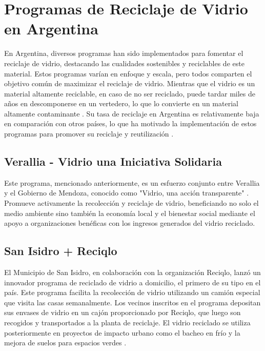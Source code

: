 \documentclass[main.tex]{subfiles}
\begin{document}
\section{Programas de Reciclaje de Vidrio en Argentina}

En Argentina, diversos programas han sido implementados para fomentar el reciclaje de vidrio, destacando las cualidades sostenibles y reciclables de este material. Estos programas varían en enfoque y escala, pero todos comparten el objetivo común de maximizar el reciclaje de vidrio. Mientras que el vidrio es un material altamente reciclable, en caso de no ser reciclado, puede tardar miles de años en descomponerse en un vertedero, lo que lo convierte en un material altamente contaminante \cite{cordoba2024vidrio}. Su tasa de reciclaje en Argentina es relativamente baja en comparación con otros países, lo que ha motivado la implementación de estos programas para promover su reciclaje y reutilización \cite{vidriotransparente2024mendoza, innovar2024vidrio, cordoba2024vidrio}.

\subsection{Verallia - Vidrio una Iniciativa Solidaria}
Este programa, mencionado anteriormente, es un esfuerzo conjunto entre Verallia y el Gobierno de Mendoza, conocido como "Vidrio, una acción transparente" \cite{vidriotransparente2024mendoza}. Promueve activamente la recolección y reciclaje de vidrio, beneficiando no solo el medio ambiente sino también la economía local y el bienestar social mediante el apoyo a organizaciones benéficas con los ingresos generados del vidrio reciclado. 

\subsection{San Isidro + Reciqlo}
El Municipio de San Isidro, en colaboración con la organización Reciqlo, lanzó un innovador programa de reciclado de vidrio a domicilio, el primero de su tipo en el país. Este programa facilita la recolección de vidrio utilizando un camión especial que visita las casas semanalmente. Los vecinos inscritos en el programa depositan sus envases de vidrio en un cajón proporcionado por Reciqlo, que luego son recogidos y transportados a la planta de reciclaje. El vidrio reciclado se utiliza posteriormente en proyectos de impacto urbano como el bacheo en frío y la mejora de suelos para espacios verdes \cite{innovar2024vidrio}.
\end{document}
